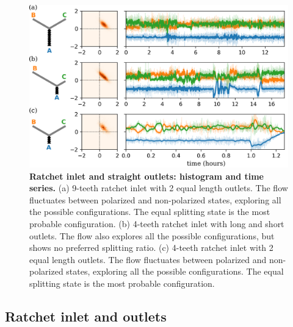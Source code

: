 \documentclass[%
10pt,
superscriptaddress,
twocolumn,
 amsmath,amssymb,
 aps,prx,
]{revtex4-2}
\begin{document}
\begin{figure}[!h]
    \includegraphics[width=\textwidth]{4-straight-channel-length}
    \caption{
    \textbf{Ratchet inlet and straight outlets: histogram and time series.}
    (a) 9-teeth ratchet inlet with 2 equal length outlets. 
    The flow fluctuates between polarized and non-polarized states, exploring all the possible configurations.
    The equal splitting state is the most probable configuration.
    (b) 4-teeth ratchet inlet with long and short outlets.
    The flow also explores all the possible configurations, but shows no preferred splitting ratio.
    (c) 4-teeth ratchet inlet with 2 equal length outlets.
    The flow fluctuates between polarized and non-polarized states, exploring all the possible configurations.
    The equal splitting state is the most probable configuration.
    }
    \label{fig:straight-channel-length}
\end{figure}

\subsection{Ratchet inlet and outlets}
\end{document}
